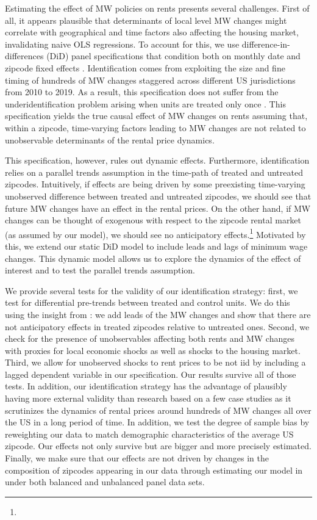 Estimating the effect of MW policies on rents presents several challenges. First of all, it appears plausible that determinants of local level MW changes might correlate with geographical and time factors also affecting the housing market, invalidating naive OLS regressions. To account for this, we use difference-in-differences (DiD) panel specifications that condition both on monthly date and zipcode fixed effects \parencite[in the same spirit as ][]{MeerWest2016}. Identification comes from exploiting the size and fine timing of hundreds of MW changes staggered across different US jurisdictions from 2010 to 2019. As a result, this specification does not suffer from the underidentification problem arising when units are treated only once \parencite{BorusyakJaravel2017}. This specification yields the true causal effect of MW changes on rents assuming that, within a zipcode, time-varying factors leading to MW changes are not related to unobservable determinants of the rental price dynamics.

This specification, however, rules out dynamic effects. Furthermore, identification relies on a parallel trends assumption in the time-path of treated and untreated zipcodes. Intuitively, if effects are being driven by some preexisting time-varying unobserved difference between treated and untreated zipcodes, we should see that future MW changes have an effect in the rental prices. On the other hand, if MW changes can be thought of exogenous with respect to the zipcode rental market (as assumed by our model), we should see no anticipatory effects.\footnote{} Motivated by this, we extend our static DiD model to include leads and lags of minimum wage changes. This dynamic model allows us to explore the dynamics of the effect of interest and to test the parallel trends assumption. 

We provide several tests for the validity of our identification strategy: first, we test for differential pre-trends between treated and control 
units. We do this using the insight from \textcite{granger1969investigating}: we add leads of the 
MW changes and show that there are not anticipatory effects in treated zipcodes relative to 
untreated ones.  Second, we check for the presence of unobservables affecting both 
rents and MW changes with proxies for local economic shocks as well as shocks to the housing market. 
Third, we allow for unobserved shocks to rent prices to be not iid by including a lagged dependent 
variable in our specification. Our results survive all of those tests. In addition, our identification 
strategy has the advantage of plausibly having more external validity than research based on a few 
case studies as it scrutinizes the dynamics of rental prices around hundreds of MW changes all over 
the US in a long period of time. In addition, we test the degree of sample bias by reweighting our 
data to match demographic characteristics of the average US zipcode. Our effects not only survive 
but are bigger and more precisely estimated. Finally, we make sure that our effects are not driven 
by changes in the composition of zipcodes appearing in our data through estimating our model in 
under both balanced and unbalanced panel data sets. 

